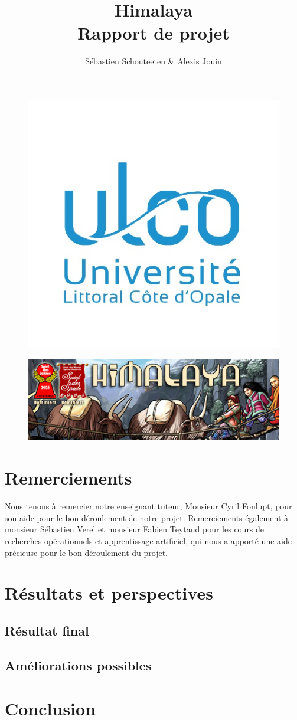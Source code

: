 \documentclass[french]{article}
\title{{\Huge Himalaya} \\ Rapport de projet}
\author{Sébastien Schouteeten \& Alexis Jouin}
\begin{document}
\begin{figure}
	\centering
	\includegraphics[width=0.5\linewidth]{images/ulco}
\end{figure}

\maketitle

\begin{figure}
	\centering
	\includegraphics[width=0.5\linewidth]{images/himalaya}
\end{figure}

\newpage

\tableofcontents

\newpage

\section{Remerciements}
Nous tenons à remercier notre enseignant tuteur, Monsieur Cyril Fonlupt, pour son aide pour le bon déroulement de notre projet. Remerciements également à monsieur Sébastien Verel et monsieur Fabien Teytaud pour les cours de recherches opérationnels et apprentissage artificiel, qui nous a apporté une aide précieuse pour le bon déroulement du projet.

\newpage



\newpage



\newpage



\newpage

\section{Résultats et perspectives}
\subsection{Résultat final}
\subsection{Améliorations possibles}

\newpage

\section{Conclusion}

\newpage


\end{document}
